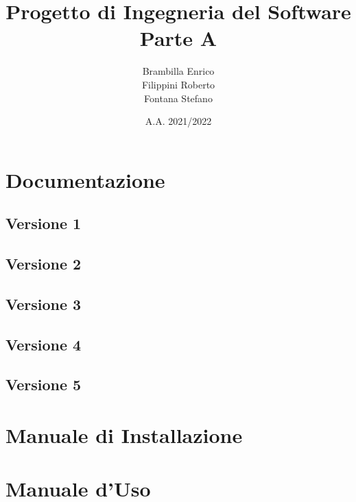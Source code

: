 \documentclass[12pt, a4paper, oneside]{book}
\title{Progetto di Ingegneria del Software\\Parte A}
\author{Brambilla Enrico\\Filippini Roberto\\Fontana Stefano}
\date{A.A. 2021/2022}
\begin{document}
\maketitle
\cleardoublepage
{}
\tableofcontents
\cleardoublepage






\chapter{Documentazione}
\section{Versione 1}


\pagebreak
\section{Versione 2}


\pagebreak
\section{Versione 3}


\pagebreak
\section{Versione 4}


\pagebreak
\section{Versione 5}


\pagebreak
\chapter{Manuale di Installazione}


\pagebreak
\chapter{Manuale d'Uso}

\end{document}
